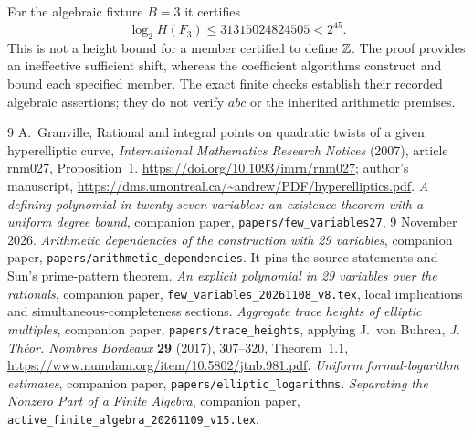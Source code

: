 \documentclass[11pt,a4paper]{article}
\begin{document}
For the algebraic fixture $B=3$ it certifies
\[
 \log_2 H(F_3)\le31315024824505<2^{45}.
\]
This is not a height bound for a member certified to define $\mathbb Z$.
The proof provides an ineffective sufficient shift, whereas the
coefficient algorithms construct and bound each specified member.
The exact finite checks establish their recorded algebraic assertions;
they do not verify $abc$ or the inherited arithmetic premises.

\begin{thebibliography}{9}
A.~Granville, Rational and integral points on quadratic twists of a
given hyperelliptic curve, \emph{International Mathematics Research
Notices} (2007), article rnm027, Proposition~1.
\url{https://doi.org/10.1093/imrn/rnm027}; author's manuscript,
\url{https://dms.umontreal.ca/~andrew/PDF/hyperelliptics.pdf}.
\emph{A defining polynomial in twenty-seven variables:
an existence theorem with a uniform degree bound},
companion paper, \nolinkurl{papers/few_variables27}, 9 November 2026.
\emph{Arithmetic dependencies of the construction with 29 variables},
companion paper, \nolinkurl{papers/arithmetic_dependencies}.
It pins the source statements and Sun's prime-pattern theorem.
\emph{An explicit polynomial in 29 variables over the rationals},
companion paper, \nolinkurl{few_variables_20261108_v8.tex},
local implications and simultaneous-completeness sections.
\emph{Aggregate trace heights of elliptic multiples}, companion
paper, \nolinkurl{papers/trace_heights}, applying J.~von Buhren,
\emph{J. Th\'eor. Nombres Bordeaux} \textbf{29} (2017), 307--320,
Theorem~1.1, \url{https://www.numdam.org/item/10.5802/jtnb.981.pdf}.
\emph{Uniform formal-logarithm estimates}, companion paper,
\nolinkurl{papers/elliptic_logarithms}.
\emph{Separating the Nonzero Part of a Finite Algebra},
companion paper, \nolinkurl{active_finite_algebra_20261109_v15.tex}.
\end{thebibliography}
\end{document}
